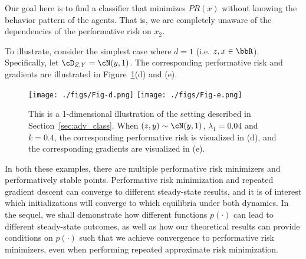 Our goal here is to find a classifier that minimizes
$PR(x)$ without knowing the behavior pattern of
the agents. That is, we are completely unaware of
the dependencies of the performative risk on $x_2$.

To illustrate, consider the simplest case where $d=1$ (i.e. $z, x \in \bbR$).
Specifically, let $\cD_{Z, Y} = \cN(y, 1)$.
The corresponding performative risk and gradients are
illustrated in Figure~\ref{fig:adv_class}(d) and (e).


\begin{figure*}[t!]
  \centering
\texttt{[image: ./figs/Fig-d.png]}
\texttt{[image: ./figs/Fig-e.png]}
  \caption{This is a 1-dimensional illustration of the setting described in 
  Section~\ref{sec:adv_class}. When $(z, y) \sim \cN(y, 1)$, $\lambda_1 = 0.04$ and
  $k = 0.4$, the corresponding performative risk is visualized in (d), and the
  corresponding gradients are visualized in (e).}
  \label{fig:adv_class}
\end{figure*}

In both these examples, there are multiple performative risk minimizers and performatively stable points. Performative risk minimization and repeated gradient descent can converge to different steady-state results, and it is of interest which initializations will converge to which equilibria under both dynamics. 
In the sequel, we shall demonstrate how different functions $p(\cdot)$ can lead to different steady-state outcomes, as well as how our theoretical results can provide conditions on $p(\cdot)$ such that we achieve convergence to performative risk minimizers, even when performing repeated approximate risk minimization.
